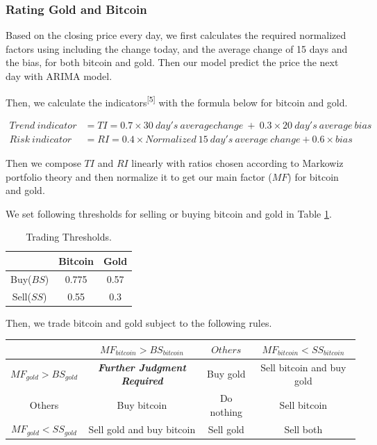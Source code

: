 \documentclass[12pt,a4paper]{article}
\begin{document}
\begin{spacing}{1.2}
\subsubsection{Rating Gold and Bitcoin}

Based on the closing price every day, we first calculates the required normalized factors using including the change today, and the average change of 15 days and the bias, for both bitcoin and gold. Then our model predict the price the next day with ARIMA model.

Then, we calculate the indicators\textsuperscript{[5]} with the formula below for bitcoin and gold. 


\begin{align*}
	Trend \ indicator &= TI = 0.7 \times 30 \ day's \ average change \ + \ 0.3 \times 20 \ day's \ average \ bias \\
	Risk \ indicator &= RI = 0.4 \times Normalized \ 15 \ day's \ average \ change + 0.6 \times bias
\end{align*}

Then we compose $TI$ and $RI$ linearly with ratios chosen according to Markowiz portfolio theory and then normalize it to get our main factor ($MF$) for bitcoin and gold. 

We set following thresholds for selling or buying bitcoin and gold in Table \ref{table:threshold}.

\begin{table}[H]
	\renewcommand{\arraystretch}{1.5}
	\caption{Trading Thresholds.}
	\label{table:threshold}
	\begin{center}
		{\footnotesize
			\begin{tabular}{c c c}
				\toprule
				{ } & {Bitcoin} & {Gold} \\
				\midrule
				Buy($BS$) & 0.775 & 0.57 \\
				Sell($SS$) & 0.55 & 0.3 \\
				\bottomrule
		\end{tabular}}
	\end{center}	
\end{table}

Then, we trade bitcoin and gold subject to the following rules.

\begin{center}
	\begin{tabular}{ |c|c|c|c| } 
		\hline
		& $MF_{bitcoin} > BS_{bitcoin}$ & $Others$ & $MF_{bitcoin} < SS_{bitcoin}$ \\ 
		\hline
		$MF_{gold} > BS_{gold}$ & \textbf{\textit{Further Judgment Required}}  & Buy gold & Sell bitcoin and buy gold  \\ 
		\hline
		Others & Buy bitcoin & Do nothing & Sell bitcoin \\
		\hline
		$MF_{gold} < SS_{gold}$ & Sell gold and buy bitcoin & Sell gold & Sell both \\ 
		\hline
	\end{tabular}
\end{center}


\end{spacing}
\end{document}

